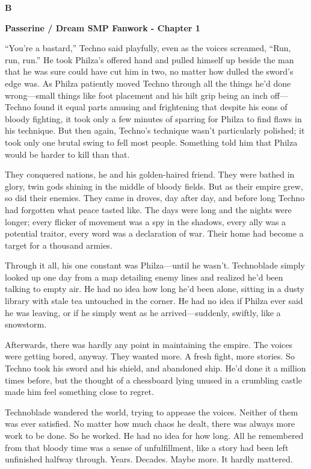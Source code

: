 \documentclass{exam-zh}
\begin{document}
{\centering \bfseries B \par}

{\centering \bfseries Passerine / Dream SMP Fanwork - Chapter 1 \par}

``You're a bastard,'' Techno said playfully, even as the voices screamed, ``Run, run, run.'' He took Philza's offered hand and pulled himself up beside the man that he was sure could have cut him in two, no matter how dulled the sword's edge was. As Philza patiently moved Techno through all the things he'd done wrong—small things like foot placement and his hilt grip being an inch off—Techno found it equal parts amusing and frightening that despite his eons of bloody fighting, it took only a few minutes of sparring for Philza to find flaws in his technique. But then again, Techno's technique wasn't particularly polished; it took only one brutal swing to fell most people. Something told him that Philza would be harder to kill than that.

They conquered nations, he and his golden-haired friend. They were bathed in glory, twin gods shining in the middle of bloody fields. But as their empire grew, so did their enemies. They came in droves, day after day, and before long Techno had forgotten what peace tasted like. The days were long and the nights were longer; every flicker of movement was a spy in the shadows, every ally was a potential traitor, every word was a declaration of war. Their home had become a target for a thousand armies.

Through it all, his one constant was Philza—until he wasn't. Technoblade simply looked up one day from a map detailing enemy lines and realized he'd been talking to empty air. He had no idea how long he'd been alone, sitting in a dusty library with stale tea untouched in the corner. He had no idea if Philza ever said he was leaving, or if he simply went as he arrived—suddenly, swiftly, like a snowstorm.

Afterwards, there was hardly any point in maintaining the empire. The voices were getting bored, anyway. They wanted more. A fresh fight, more stories. So Techno took his sword and his shield, and abandoned ship. He'd done it a million times before, but the thought of a chessboard lying unused in a crumbling castle made him feel something close to regret.

Technoblade wandered the world, trying to appease the voices. Neither of them was ever satisfied. No matter how much chaos he dealt, there was always more work to be done. So he worked. He had no idea for how long. All he remembered from that bloody time was a sense of unfulfillment, like a story had been left unfinished halfway through. Years. Decades. Maybe more. It hardly mattered.
\end{document}
